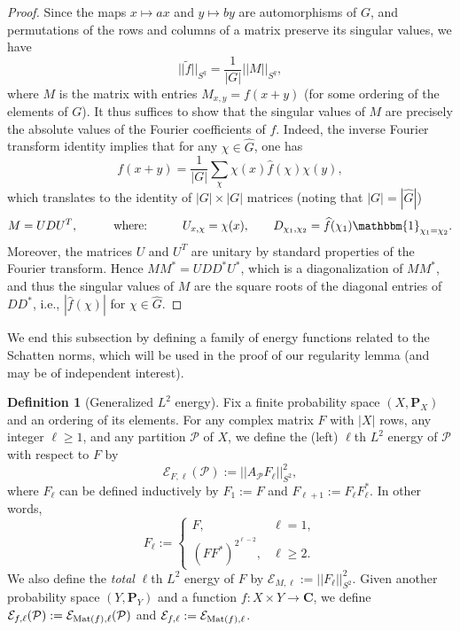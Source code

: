 \documentclass[reqno,11pt]{amsart}
\theoremstyle{definition}
\newtheorem{definition}[theorem]{Definition}
\theoremstyle{remark}
\numberwithin{equation}{section}
\newcommand{\C}{\mathbf{C}}
\renewcommand{\P}{\mathbf{P}}
\newcommand{\mE}{\mathcal{E}}
\newcommand{\mP}{\mathcal{P}}
\newcommand{\one}{\mathbbm{1}}
\renewcommand{\hat}{\widehat}
\renewcommand{\tilde}{\widetilde}
\newcommand{\Mat}{\textnormal{Mat}}
\begin{document}
\begin{proof}
Since the maps $x \mapsto ax$ and $y \mapsto by$ are automorphisms of $G$, and permutations of the rows and columns of a matrix preserve its singular values, we have
\[
    ||\tilde{f}||_{S^q}
    =
    \frac{1}{|G|}||M||_{S^q},
\]
where $M$ is the matrix with entries $M_{x,y} = f(x+y)$ (for some ordering of the elements of $G$). It thus suffices to show that the singular values of $M$ are precisely the absolute values of the Fourier coefficients of $f$. Indeed, the inverse Fourier transform identity implies that for any $\chi \in \hat{G}$, one has
\[
    f(x+y) = \frac{1}{|G|} \sum_{\chi} \chi(x) \hat{f}(\chi) \chi(y),
\]
which translates to the identity of $|G| \times |G|$ matrices (noting that $|G| = |\hat{G}|$)
\[
    M = U D U^T,
    \qquad\quad \text{where:}\qquad\quad  
    U_{x,\chi} = \chi(x),
    \qquad 
    D_{\chi_1, \chi_2} = \hat{f}(\chi_1) \one_{\chi_1 = \chi_2}.
\]
Moreover, the matrices $U$ and $U^T$ are unitary by standard properties of the Fourier transform. Hence $M M^* = U D D^* U^*$, which is a diagonalization of $MM^*$, and thus the singular values of $M$ are the square roots of the diagonal entries of $D D^*$, i.e., $|\hat{f}(\chi)|$ for $\chi \in \hat{G}$.
\end{proof}




We end this subsection by defining a family of energy functions related to the Schatten norms, which will be used in the proof of our regularity lemma (and may be of independent interest).


\begin{definition}[Generalized $L^2$ energy] \label{def:generalized-L2-energy}
Fix a finite probability space $(X, \P_X)$ and an ordering of its elements. For any complex matrix $F$ with $|X|$ rows, any integer $\ell \ge 1$, and any partition $\mP$ of $X$, we define the (left) $\ell$th $L^2$ energy of $\mP$ with respect to $F$ by
\[
    \mE_{F,\ell}(\mP) := ||A_\mP F_\ell||_{S^2}^2,
\]
where $F_\ell$ can be defined inductively by $F_1 := F$ and $F_{\ell+1} := F_\ell F_\ell^*$. In other words,
\[
    F_\ell := 
    \begin{cases} 
        F, & \ell = 1, \\
        (FF^*)^{2^{\ell-2}}, & \ell \ge 2.
    \end{cases}
\]
We also define the \emph{total} $\ell$th $L^2$ energy of $F$ by $\mE_{M,\ell} := ||F_\ell||_{S^2}^2$. Given another probability space $(Y, \P_Y)$ and a function $f : X \times Y \to \C$, we define $\mE_{f,\ell}(\mP) := \mE_{\Mat(f),\ell}(\mP)$ and $\mE_{f,\ell} := \mE_{\Mat(f),\ell}$.
\end{definition}
\end{document}
